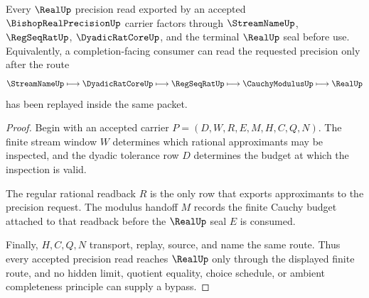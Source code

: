 \begin{theorem}
\label{thm:bishop-real-precision-regseqrat-handoff}
Every $\RealUp$ precision read exported by an accepted $\BishopRealPrecisionUp$ carrier factors through $\StreamNameUp$, $\RegSeqRatUp$, $\DyadicRatCoreUp$, and the terminal $\RealUp$ seal before use. Equivalently, a completion-facing consumer can read the requested precision only after the route
$$
\StreamNameUp \longmapsto \DyadicRatCoreUp \longmapsto \RegSeqRatUp \longmapsto \CauchyModulusUp \longmapsto \RealUp
$$
has been replayed inside the same packet.
\end{theorem}
\begin{proof}
Begin with an accepted carrier $P=(D,W,R,E,M,H,C,Q,N)$. The finite stream window $W$ determines which rational approximants may be inspected, and the dyadic tolerance row $D$ determines the budget at which the inspection is valid.

The regular rational readback $R$ is the only row that exports approximants to the precision request. The modulus handoff $M$ records the finite Cauchy budget attached to that readback before the $\RealUp$ seal $E$ is consumed.

Finally, $H,C,Q,N$ transport, replay, source, and name the same route. Thus every accepted precision read reaches $\RealUp$ only through the displayed finite route, and no hidden limit, quotient equality, choice schedule, or ambient completeness principle can supply a bypass.
\end{proof}


\begin{closurestatus}{\BishopRealPrecisionUp}
  \theoryclosure{\seedClosure}
  \formalstatus{\unformalizedV}
\end{closurestatus}

